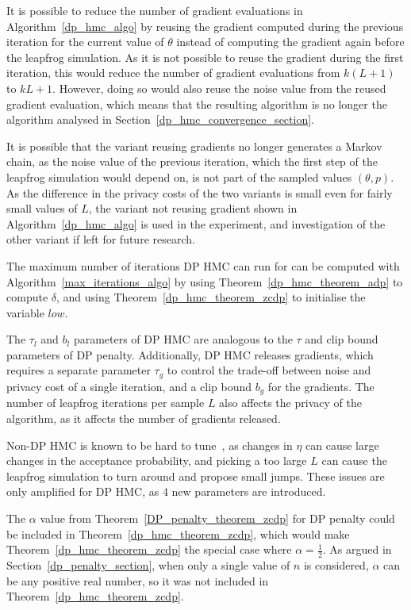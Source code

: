 \documentclass[english,twoside,openright]{HYgraduMLDS}
\begin{document}
It is possible to reduce the number of gradient evaluations in
Algorithm~\ref{dp_hmc_algo} by reusing the gradient computed during the previous
iteration for the current value of \(\theta\) instead of computing the gradient
again before the leapfrog simulation. As it is not possible to reuse the gradient
during the first iteration, this would reduce the number of gradient evaluations
from \(k(L + 1)\) to \(kL + 1\). However, doing so would
also reuse the noise value from the reused gradient evaluation, which means that
the resulting algorithm is no longer the algorithm analysed in
Section~\ref{dp_hmc_convergence_section}.

It is possible that the variant reusing gradients no longer
generates a Markov chain, as the noise value of the previous iteration, which
the first step of the leapfrog simulation would depend on, is not
part of the sampled values \((\theta, p)\). As the difference in the privacy
costs of the two variants is small even for fairly small values of \(L\),
the variant not reusing gradient shown in Algorithm~\ref{dp_hmc_algo}
is used in the experiment, and investigation of the other variant if left
for future research.

The maximum number of iterations DP HMC can run for can be computed with
Algorithm~\ref{max_iterations_algo} by using Theorem~\ref{dp_hmc_theorem_adp}
to compute \(\delta\), and using Theorem~\ref{dp_hmc_theorem_zcdp}
to initialise the variable \(low\).

The \(\tau_{l}\) and \(b_{l}\) parameters of DP HMC are analogous to the
\(\tau\) and clip bound parameters of DP penalty. Additionally, DP HMC
releases gradients, which requires a separate parameter \(\tau_{g}\) to
control the trade-off between noise and privacy cost of a single iteration,
and a clip bound \(b_{g}\) for the gradients. The number of leapfrog iterations
per sample \(L\) also affects the privacy of the algorithm, as it affects the
number of gradients released.

Non-DP HMC is known to be hard to tune~\cite{neal2012mcmc},
as changes in \(\eta\) can cause large changes in the acceptance probability,
and picking a too large \(L\) can cause the leapfrog simulation to turn
around and propose small jumps. These issues are only amplified for DP HMC,
as 4 new parameters are introduced.

The \(\alpha\) value from Theorem~\ref{DP_penalty_theorem_zcdp} for
DP penalty could be included in Theorem~\ref{dp_hmc_theorem_zcdp},
which would make Theorem~\ref{dp_hmc_theorem_zcdp} the special case where
\(\alpha = \frac{1}{2}\). As argued in Section~\ref{dp_penalty_section},
when only a single value of \(n\) is considered, \(\alpha\) can be
any positive real number, so it was not included in
Theorem~\ref{dp_hmc_theorem_zcdp}.
\end{document}

